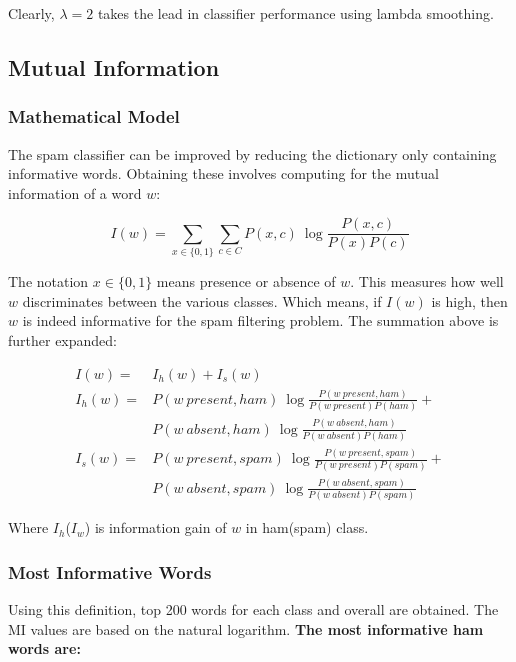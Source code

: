 \documentclass{article}
\begin{document}
Clearly, $\lambda=2$ takes the lead in classifier performance using lambda smoothing.

\subsection{Mutual Information}
\subsubsection*{Mathematical Model}
The spam classifier can be improved by reducing the dictionary only containing informative words. Obtaining these involves computing for the mutual information\cite{bib:emi} of a word $w$:

\begin{equation*}
I(w) = \sum_{x \in \{0, 1\}} \sum_{c \in C} P(x, c) \: \log\frac{P(x, c)}{P(x) P(c)}
\end{equation*}

The notation $x \in \{0, 1\}$ means presence or absence of $w$. This measures how well $w$ discriminates between the various classes\cite{bib:mi}. Which means, if $I(w)$ is high, then $w$ is indeed informative for the spam filtering problem. The summation above is further expanded:

\begin{align*}
I(w) = & I_h(w) + I_s(w) \\
I_h(w) = & P(w\:present, ham) \: \log \frac{P(w\:present, ham)}{P(w\:present)P(ham)} + \\
&P(w\:absent, ham) \: \log \frac{P(w\:absent, ham)}{P(w\:absent)P(ham)} \\
I_s(w) = & P(w\:present, spam) \: \log \frac{P(w\:present, spam)}{P(w\:present)P(spam)} + \\
&P(w\:absent, spam) \: \log \frac{P(w\:absent, spam)}{P(w\:absent)P(spam)}
\end{align*}

Where $I_h$($I_w$) is information gain of $w$ in ham(spam) class.

\subsubsection*{Most Informative Words}
Using this definition, top 200 words for each class and overall are obtained. The MI values are based on the natural logarithm. \textbf{The most informative ham words are:}
\end{document}
